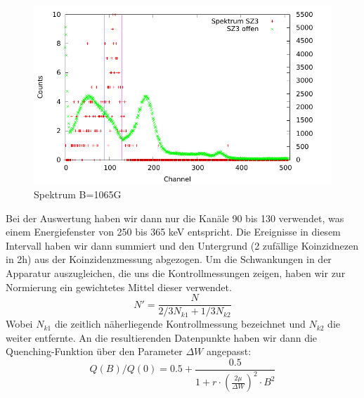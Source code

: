 \begin{figure}[H]
 \includegraphics[width=\textwidth]{Graphen/quench/spektrum_1065.pdf}
 \caption{Spektrum B=1065G}
\end{figure}


% 
% 
% 


Bei der Auswertung haben wir dann nur die Kanäle 90 bis 130 verwendet, was einem Energiefenster von 250 bis 365 keV entspricht. Die Ereignisse in diesem Intervall haben wir dann summiert und den Untergrund (2 zufällige Koinzidnezen in 2h) aus der Koinzidenzmessung abgezogen. Um die Schwankungen in der Apparatur auszugleichen, die uns die Kontrollmessungen zeigen, haben wir zur Normierung ein gewichtetes Mittel dieser verwendet.
\begin{equation*}
 N' = \frac{N}{2/3 N_{k1} + 1/3 N_{k2}}
\end{equation*}
Wobei $N_{k1}$ die zeitlich näherliegende Kontrollmessung bezeichnet und $N_{k2}$ die weiter entfernte. An die resultierenden Datenpunkte haben wir dann die Quenching-Funktion über den Parameter $\Delta W$ angepasst:
\begin{equation*}
 Q(B)/Q(0) = 0.5 + \frac{0.5}{1 + r \cdot ( \frac{2  \mu }{ \Delta W})^2 \cdot B^2} 
\end{equation*}


